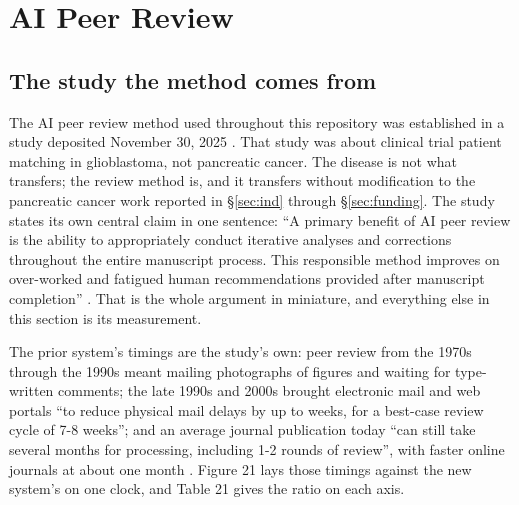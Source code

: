 \section{AI Peer Review}
\label{sec:peerreview}

\subsection{The study the method comes from}

The AI peer review method used throughout this repository was established in a
study deposited November 30, 2025 \cite{aiprgliomatc}. That study was about
clinical trial patient matching in glioblastoma, not pancreatic cancer. The
disease is not what transfers; the review method is, and it transfers without
modification to the pancreatic cancer work reported in \S\ref{sec:ind} through \S\ref{sec:funding}. The
study states its own central claim in one sentence: ``A primary benefit of AI
peer review is the ability to appropriately conduct iterative analyses and
corrections throughout the entire manuscript process. This responsible method
improves on over-worked and fatigued human recommendations provided after
manuscript completion'' \cite{aiprgliomatc}. That is the whole argument in
miniature, and everything else in this section is its measurement.

The prior system's timings are the study's own: peer review from the 1970s
through the 1990s meant mailing photographs of figures and waiting for
type-written comments; the late 1990s and 2000s brought electronic mail and web
portals ``to reduce physical mail delays by up to weeks, for a best-case review
cycle of 7-8 weeks''; and an average journal publication today ``can still take
several months for processing, including 1-2 rounds of review'', with faster
online journals at about one month \cite{aiprgliomatc}. Figure 21 lays those
timings against the new system's on one clock, and Table 21 gives the ratio on
each axis.

